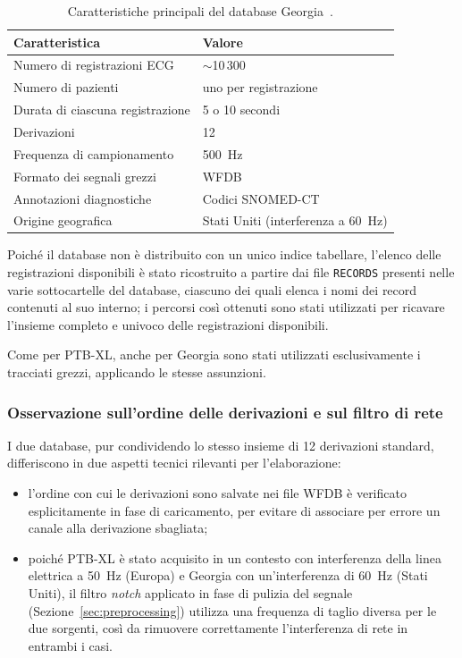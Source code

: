 \begin{table}[htbp]
	\centering
	\caption{Caratteristiche principali del database Georgia~\cite{alday2020georgia}.}
	\label{tab:georgia_caratteristiche}
	\begin{tabular}{@{}ll@{}}
		\toprule
		\textbf{Caratteristica} & \textbf{Valore} \\
		\midrule
		Numero di registrazioni ECG & $\sim$10\,300 \\
		Numero di pazienti & uno per registrazione \\
		Durata di ciascuna registrazione & 5 o 10 secondi \\
		Derivazioni & 12 \\
		Frequenza di campionamento & 500~Hz \\
		Formato dei segnali grezzi & WFDB \\
		Annotazioni diagnostiche & Codici SNOMED-CT \\
		Origine geografica & Stati Uniti (interferenza a \SI{60}{Hz}) \\
		\bottomrule
	\end{tabular}
\end{table}

Poiché il database non è distribuito con un unico indice tabellare, l'elenco delle registrazioni disponibili è stato ricostruito a partire dai file \texttt{RECORDS} presenti nelle varie sottocartelle del database, ciascuno dei quali elenca i nomi dei record contenuti al suo interno; i percorsi così ottenuti sono stati utilizzati per ricavare l'insieme completo e univoco delle registrazioni disponibili.

Come per PTB-XL, anche per Georgia sono stati utilizzati esclusivamente i tracciati grezzi, applicando le stesse assunzioni.

\subsubsection{Osservazione sull'ordine delle derivazioni e sul filtro di rete}

I due database, pur condividendo lo stesso insieme di 12 derivazioni standard, differiscono in due aspetti tecnici rilevanti per l'elaborazione:

\begin{itemize}
	\item l'ordine con cui le derivazioni sono salvate nei file WFDB è verificato esplicitamente in fase di caricamento, per evitare di associare per errore un canale alla derivazione sbagliata;
	\item poiché PTB-XL è stato acquisito in un contesto con interferenza della linea elettrica a \SI{50}{Hz} (Europa) e Georgia con un'interferenza di \SI{60}{Hz} (Stati Uniti), il filtro \emph{notch} applicato in fase di pulizia del segnale (Sezione~\ref{sec:preprocessing}) utilizza una frequenza di taglio diversa per le due sorgenti, così da rimuovere correttamente l'interferenza di rete in entrambi i casi.
\end{itemize}

